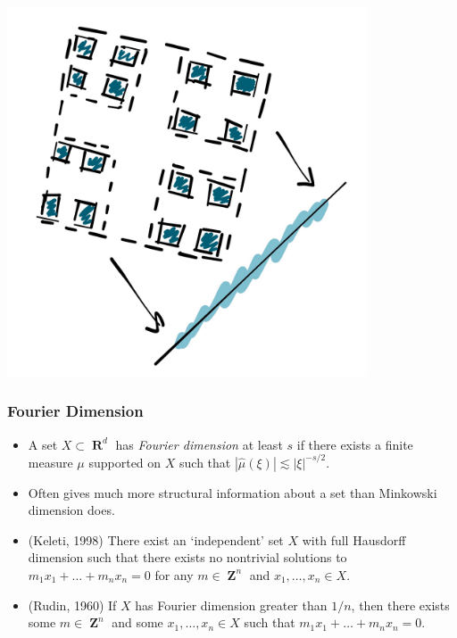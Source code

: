 \documentclass[usenames,dvipsnames,handout]{beamer}
\DeclareMathOperator{\RR}{\textbf{R}}
\DeclareMathOperator{\ZZ}{\textbf{Z}}
\begin{document}
\begin{frame}

\begin{center}
\includegraphics[width=0.8\textwidth]{../Images/CantorDustProjection}
\end{center}

\end{frame}





\begin{frame}
    \frametitle{Fourier Dimension}

    \begin{itemize}
        \pause
        \item A set $X \subset \RR^d$ has \emph{Fourier dimension} at least $s$ if there exists a finite measure $\mu$ supported on $X$ such that $|\widehat{\mu}(\xi)| \lesssim |\xi|^{-s/2}$.

        \pause
        \item Often gives much more structural information about a set than Minkowski dimension does.

        \pause
        \item (Keleti, 1998) There exist an `independent' set $X$ with full Hausdorff dimension such that there exists no nontrivial solutions to $m_1x_1 + \dots + m_nx_n = 0$ for any $m \in \ZZ^n$ and $x_1, \dots, x_n \in X$.

        \pause
        \item (Rudin, 1960) If $X$ has Fourier dimension greater than $1/n$, then there exists some $m \in \ZZ^n$ and some $x_1, \dots, x_n \in X$ such that $m_1 x_1 + \dots + m_n x_n = 0$.
    \end{itemize}
\end{frame}
\end{document}
